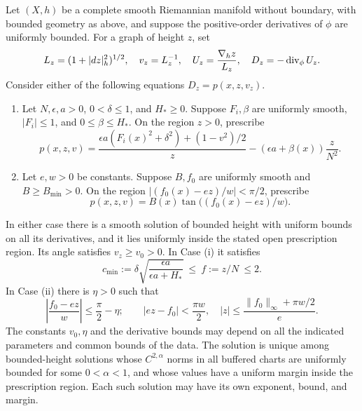 \begin{lemma}
\label{lem:graph-prescription}
Let \((X,h)\) be a complete smooth Riemannian manifold without
boundary, with bounded geometry as above, and suppose the
positive-order derivatives of \(\phi\) are uniformly bounded.  For
a graph of height \(z\), set
\[
 L_z=(1+|dz|_h^2)^{1/2},\quad v_z=L_z^{-1},\quad
 U_z=\frac{\nabla_hz}{L_z},\quad
 D_z=-\operatorname{div}_\phi U_z .
\]
Consider either of the following equations \(D_z=p(x,z,v_z)\).

\begin{enumerate}
\renewcommand{\labelenumi}{\textup{(\roman{enumi})}}
\item Let \(N,\epsilon,a>0\), \(0<\delta\le1\), and \(H_*\ge0\).
  Suppose \(F_i,\beta\) are uniformly smooth,
  \(|F_i|\le1\), and \(0\le\beta\le H_*\).  On the region \(z>0\),
  prescribe
  \begin{equation}
   p(x,z,v)=
   \frac{\epsilon a(F_i(x)^2+\delta^2)+(1-v^2)/2}{z}
       -(\epsilon a+\beta(x))\frac{z}{N^2}.
   \label{eq:graph-prescription-positive}
  \end{equation}
\item Let \(e,w>0\) be constants.  Suppose \(B,f_0\) are uniformly
  smooth and \(B\ge B_{\min}>0\).  On the region
  \(|(f_0(x)-ez)/w|<\pi/2\), prescribe
  \begin{equation}
   p(x,z,v)=B(x)\tan\bigl((f_0(x)-ez)/w\bigr).
   \label{eq:graph-prescription-tangent}
  \end{equation}
\end{enumerate}

In either case there is a smooth solution of bounded height with
uniform bounds on all its derivatives, and it lies uniformly inside
the stated open prescription region.  Its angle satisfies
\(v_z\ge v_0>0\).  In Case \textup{(i)} it satisfies
\begin{equation}
 c_{\min}:=\delta\sqrt{\frac{\epsilon a}{\epsilon a+H_*}}
       \ \le\ f:=z/N\ \le 2.
 \label{eq:graph-height-positive}
\end{equation}
In Case \textup{(ii)} there is \(\eta>0\) such that
\[
 \left|\frac{f_0-ez}{w}\right|\le\frac{\pi}{2}-\eta;
 \qquad
 |ez-f_0|<\frac{\pi w}{2},\quad
 |z|\le\frac{\|f_0\|_\infty+\pi w/2}{e}.
\]
The constants \(v_0,\eta\) and the derivative bounds may depend on
all the indicated parameters and common bounds of the data.
The solution is unique among bounded-height solutions whose
\(C^{2,\alpha}\) norms in all buffered charts are uniformly bounded
for some \(0<\alpha<1\), and whose values have a uniform margin inside
the prescription region.  Each such solution may have its own
exponent, bound, and margin.


\end{lemma}
